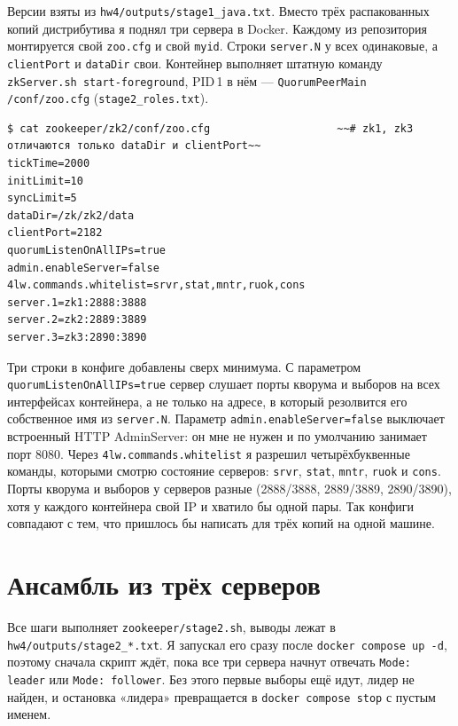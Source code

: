 \documentclass[11pt,a4paper]{article}
\newcommand{\code}[1]{\texttt{#1}}
\begin{document}
Версии взяты из \code{hw4/outputs/stage1\_java.txt}. Вместо трёх распакованных копий дистрибутива я поднял три сервера в Docker. Каждому из репозитория монтируется свой \code{zoo.cfg} и свой \code{myid}. Строки \code{server.N} у всех одинаковые, а \code{clientPort} и \code{dataDir} свои. Контейнер выполняет штатную команду \code{zkServer.sh start-foreground}, PID\,1 в нём --- \code{QuorumPeerMain /conf/zoo.cfg} (\code{stage2\_roles.txt}).
\begin{lstlisting}
$ cat zookeeper/zk2/conf/zoo.cfg                    ~~# zk1, zk3 отличаются только dataDir и clientPort~~
tickTime=2000
initLimit=10
syncLimit=5
dataDir=/zk/zk2/data
clientPort=2182
quorumListenOnAllIPs=true
admin.enableServer=false
4lw.commands.whitelist=srvr,stat,mntr,ruok,cons
server.1=zk1:2888:3888
server.2=zk2:2889:3889
server.3=zk3:2890:3890
\end{lstlisting}

Три строки в конфиге добавлены сверх минимума. С параметром \code{quorumListenOnAllIPs=true} сервер слушает порты кворума и выборов на всех интерфейсах контейнера, а не только на адресе, в который резолвится его собственное имя из \code{server.N}. Параметр \code{admin.enableServer=false} выключает встроенный HTTP AdminServer: он мне не нужен и по умолчанию занимает порт 8080. Через \code{4lw.commands.whitelist} я разрешил четырёхбуквенные команды, которыми смотрю состояние серверов: \code{srvr}, \code{stat}, \code{mntr}, \code{ruok} и \code{cons}. Порты кворума и выборов у серверов разные (2888/3888, 2889/3889, 2890/3890), хотя у каждого контейнера свой IP и хватило бы одной пары. Так конфиги совпадают с тем, что пришлось бы написать для трёх копий на одной машине.

\section{Ансамбль из трёх серверов}

Все шаги выполняет \code{zookeeper/stage2.sh}, выводы лежат в \code{hw4/outputs/stage2\_*.txt}. Я запускал его сразу после \code{docker compose up -d}, поэтому сначала скрипт ждёт, пока все три сервера начнут отвечать \code{Mode: leader} или \code{Mode: follower}. Без этого первые выборы ещё идут, лидер не найден, и остановка «лидера» превращается в \code{docker compose stop} с пустым именем.
\end{document}
